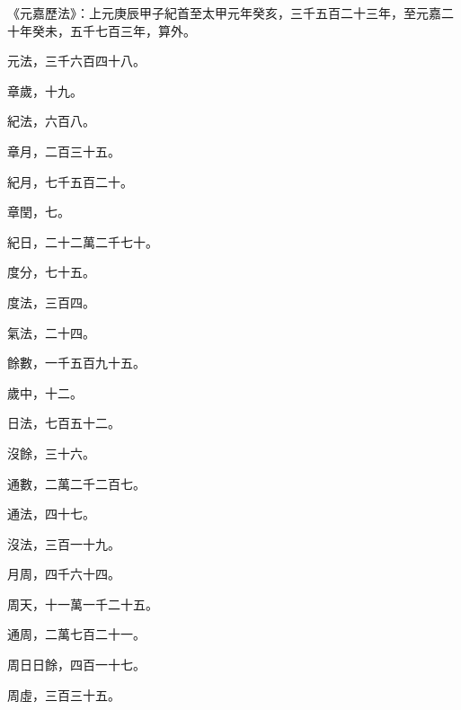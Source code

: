 
\begin{pinyinscope}

 《元嘉歷法》：上元庚辰甲子紀首至太甲元年癸亥，三千五百二十三年，至元嘉二十年癸未，五千七百三年，算外。



 元法，三千六百四十八。



 章歲，十九。



 紀法，六百八。



 章月，二百三十五。



 紀月，七千五百二十。



 章閏，七。



 紀日，二十二萬二千七十。



 度分，七十五。



 度法，三百四。



 氣法，二十四。



 餘數，一千五百九十五。



 歲中，十二。



 日法，七百五十二。



 沒餘，三十六。



 通數，二萬二千二百七。



 通法，四十七。



 沒法，三百一十九。



 月周，四千六十四。



 周天，十一萬一千二十五。



 通周，二萬七百二十一。



 周日日餘，四百一十七。



 周虛，三百三十五。




\end{pinyinscope}
